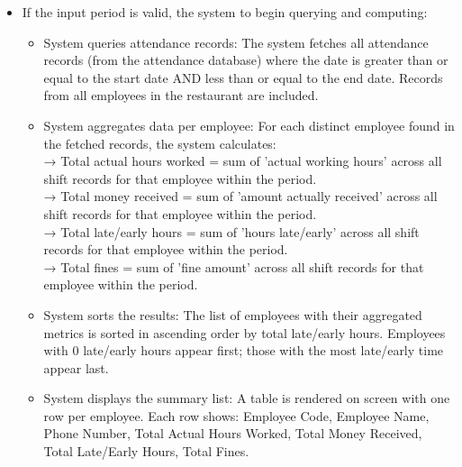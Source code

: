 \begin{itemize}
\begin{itemize}
\begin{itemize}
\begin{itemize}
                \item The system clear all input data and inform  “The start date must be lower or equal to the end date!” below the date input field. If the Executive Manager does not reenter input information:\\
                → Finish
                \item If the Executive Manager reenter input information\\
                → Repeat from the entering the reporting period.
            \end{itemize}
            \item If the input period is valid, the system to begin querying and computing:
            \begin{itemize}
                \item System queries attendance records: The system fetches all attendance records (from the attendance database) where the date is greater than or equal to the start date AND less than or equal to the end date. Records from all employees in the restaurant are included.
                \item System aggregates data per employee: For each distinct employee found in the fetched records, the system calculates:\\
                → Total actual hours worked = sum of 'actual working hours' across all shift records for that employee within the period.\\
                → Total money received = sum of 'amount actually received' across all shift records for that employee within the period.\\
                → Total late/early hours = sum of 'hours late/early' across all shift records for that employee within the period.\\
                → Total fines = sum of 'fine amount' across all shift records for that employee within the period.\\
                \item System sorts the results: The list of employees with their aggregated metrics is sorted in ascending order by total late/early hours. Employees with 0 late/early hours appear first; those with the most late/early time appear last.
                \item System displays the summary list: A table is rendered on screen with one row per employee. Each row shows: Employee Code, Employee Name, Phone Number, Total Actual Hours Worked, Total Money Received, Total Late/Early Hours, Total Fines.

\end{itemize}
\end{itemize}
\end{itemize}
\end{itemize}
